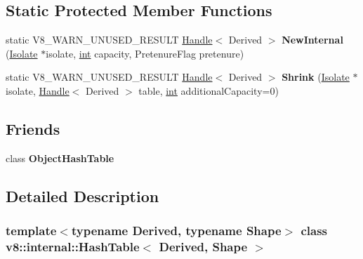 \subsection*{Static Protected Member Functions}
\begin{DoxyCompactItemize}
\item 
\mbox{\label{classv8_1_1internal_1_1HashTable_a830dc3e6363f7aabf993ac665424e657}} 
static V8\+\_\+\+W\+A\+R\+N\+\_\+\+U\+N\+U\+S\+E\+D\+\_\+\+R\+E\+S\+U\+LT \mbox{\hyperlink{classv8_1_1internal_1_1Handle}{Handle}}$<$ Derived $>$ {\bfseries New\+Internal} (\mbox{\hyperlink{classv8_1_1internal_1_1Isolate}{Isolate}} $\ast$isolate, \mbox{\hyperlink{classint}{int}} capacity, Pretenure\+Flag pretenure)
\item 
\mbox{\label{classv8_1_1internal_1_1HashTable_a9e8fcea8c95e2c1d14451af6558c9da9}} 
static V8\+\_\+\+W\+A\+R\+N\+\_\+\+U\+N\+U\+S\+E\+D\+\_\+\+R\+E\+S\+U\+LT \mbox{\hyperlink{classv8_1_1internal_1_1Handle}{Handle}}$<$ Derived $>$ {\bfseries Shrink} (\mbox{\hyperlink{classv8_1_1internal_1_1Isolate}{Isolate}} $\ast$isolate, \mbox{\hyperlink{classv8_1_1internal_1_1Handle}{Handle}}$<$ Derived $>$ table, \mbox{\hyperlink{classint}{int}} additional\+Capacity=0)
\end{DoxyCompactItemize}
\subsection*{Friends}
\begin{DoxyCompactItemize}
\item 
\mbox{\label{classv8_1_1internal_1_1HashTable_ac26f85b18a3d4e9b953069cc69ab9a9f}} 
class {\bfseries Object\+Hash\+Table}
\end{DoxyCompactItemize}


\subsection{Detailed Description}
\subsubsection*{template$<$typename Derived, typename Shape$>$\newline
class v8\+::internal\+::\+Hash\+Table$<$ Derived, Shape $>$}



